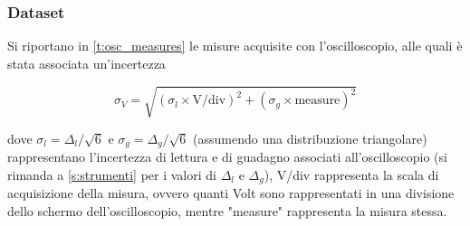 \documentclass[a4paper,11pt]{article} %
\begin{document}

\subsubsection{Dataset}
Si riportano in  \autoref{t:osc_measures} le misure acquisite con l'oscilloscopio, alle quali è stata associata un'incertezza

\begin{equation}\label{e:osc}
	\sigma_{V} = \sqrt{ (\sigma_{l}\times\text{V/div})^2 + (\sigma_{g}\times\text{measure})^2 }
\end{equation}

\noindent dove $\sigma_{l}=\Delta_{l}/\sqrt{6}$ e $\sigma_{g}=\Delta_{g}/\sqrt{6}$ (assumendo una distribuzione
triangolare) rappresentano l'incertezza di lettura e di guadagno associati all'oscilloscopio (si rimanda a 
\autoref{s:strumenti} per i valori di $\Delta_{l}$ e $\Delta_{g}$), V/div rappresenta la scala di acquisizione della misura,
ovvero quanti Volt sono rappresentati in una divisione dello schermo dell'oscilloscopio, mentre "measure" rappresenta la
misura stessa.
\end{document}
